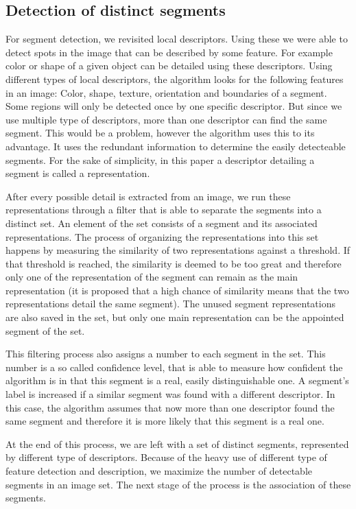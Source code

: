 \subsection{Detection of distinct segments} %
For segment detection, we revisited local descriptors. Using these we were able to detect spots in the image that can be described by some feature. For example color or shape of a given object can be detailed using these descriptors. Using different types of local descriptors, the algorithm looks for the following features in an image: Color, shape, texture, orientation and boundaries of a segment. Some regions will only be detected once by one specific descriptor. But since we use multiple type of descriptors, more than one descriptor can find the same segment. This would be a problem, however the algorithm uses this to its advantage. It uses the redundant information to determine the easily detecteable segments. For the sake of simplicity, in this paper a descriptor detailing a segment is called a representation.

After every possible detail is extracted from an image, we run these representations through a filter that is able to separate the segments into a distinct set. An element of the set consists of a segment and its associated representations. The process of organizing the representations into this set happens by measuring the similarity of two representations against a threshold. If that threshold is reached, the similarity is deemed to be too great and therefore only one of the representation of the segment can remain as the main representation (it is proposed that a high chance of similarity means that the two representations detail the same segment). The unused segment representations are also saved in the set, but only one main representation can be the appointed segment of the set.  

This filtering process also assigns a number to each segment in the set. This number is a so called confidence level, that is able to measure how confident the algorithm is in that this segment is a real, easily distinguishable one. A segment's label is increased if a similar segment was found with a different descriptor. In this case, the algorithm assumes that now more than one descriptor found the same segment and therefore it is more likely that this segment is a real one. 


At the end of this process, we are left with a set of distinct segments, represented by different type of descriptors. Because of the heavy use of different type of feature detection and description, we maximize the number of detectable segments in an image set. The next stage of the process is the association of these segments.

